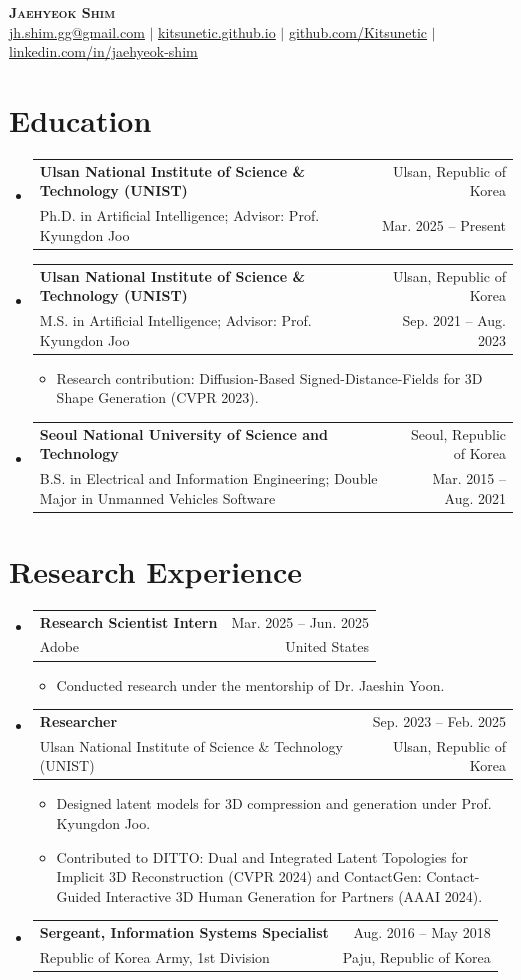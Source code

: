 \documentclass[letterpaper,11pt]{article}
\makeatletter
\newcommand{\resumeItem}[1]{
  \item\small{{#1 \vspace{-2pt}}
  }
}
\newcommand{\resumeSubheading}[4]{
  \vspace{-2pt}\item
    \begin{tabular*}{0.97\textwidth}[t]{l@{\extracolsep{\fill}}r}
      \textbf{#1} & #2 \\
      {\small #3} & {\small #4} \\
    \end{tabular*}\vspace{-7pt}
}
\newcommand{\resumeSubHeadingListStart}{\begin{itemize}[leftmargin=0.15in, label={}]}
\newcommand{\resumeSubHeadingListEnd}{\end{itemize}}
\newcommand{\resumeItemListStart}{\begin{itemize}}
\newcommand{\resumeItemListEnd}{\end{itemize}\vspace{-5pt}}
\makeatother
\begin{document}
\begin{center}
    \textbf{\Huge \scshape Jaehyeok Shim} \\ \vspace{1pt}
    \small \href{mailto:jh.shim.gg@gmail.com}{\underline{jh.shim.gg@gmail.com}} $|$
    \href{https://kitsunetic.github.io}{\underline{kitsunetic.github.io}} $|$
    \href{https://github.com/Kitsunetic}{\underline{github.com/Kitsunetic}} $|$
    \href{https://www.linkedin.com/in/jaehyeok-shim-366766213}{\underline{linkedin.com/in/jaehyeok-shim}}
\end{center}

\section{Education}
  \resumeSubHeadingListStart
    \resumeSubheading
      {Ulsan National Institute of Science \& Technology (UNIST)}{Ulsan, Republic of Korea}
      {Ph.D. in Artificial Intelligence; Advisor: Prof. Kyungdon Joo}{Mar. 2025 -- Present}
    \resumeSubheading
      {Ulsan National Institute of Science \& Technology (UNIST)}{Ulsan, Republic of Korea}
      {M.S. in Artificial Intelligence; Advisor: Prof. Kyungdon Joo}{Sep. 2021 -- Aug. 2023}
      \resumeItemListStart
        \resumeItem{Research contribution: Diffusion-Based Signed-Distance-Fields for 3D Shape Generation (CVPR 2023).}
      \resumeItemListEnd
    \resumeSubheading
      {Seoul National University of Science and Technology}{Seoul, Republic of Korea}
      {B.S. in Electrical and Information Engineering; Double Major in Unmanned Vehicles Software}{Mar. 2015 -- Aug. 2021}
  \resumeSubHeadingListEnd

\section{Research Experience}
  \resumeSubHeadingListStart
    \resumeSubheading
      {Research Scientist Intern}{Mar. 2025 -- Jun. 2025}
      {Adobe}{United States}
      \resumeItemListStart
        \resumeItem{Conducted research under the mentorship of Dr. Jaeshin Yoon.}
      \resumeItemListEnd
    \resumeSubheading
      {Researcher}{Sep. 2023 -- Feb. 2025}
      {Ulsan National Institute of Science \& Technology (UNIST)}{Ulsan, Republic of Korea}
      \resumeItemListStart
        \resumeItem{Designed latent models for 3D compression and generation under Prof. Kyungdon Joo.}
        \resumeItem{Contributed to DITTO: Dual and Integrated Latent Topologies for Implicit 3D Reconstruction (CVPR 2024) and ContactGen: Contact-Guided Interactive 3D Human Generation for Partners (AAAI 2024).}
      \resumeItemListEnd
    \resumeSubheading
      {Sergeant, Information Systems Specialist}{Aug. 2016 -- May 2018}
      {Republic of Korea Army, 1st Division}{Paju, Republic of Korea}
  \resumeSubHeadingListEnd
\end{document}

